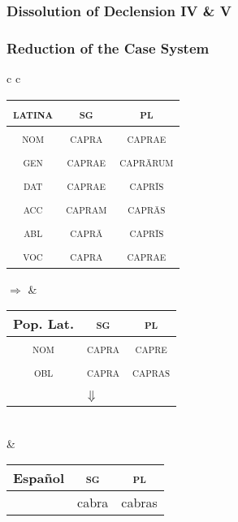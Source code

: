 \documentclass{report}
\begin{document}
\subsubsection{Dissolution of Declension IV \& V}

\subsubsection{Reduction of the Case System}

\begin{tabular}{c c}
  \begin{tabular}{|c|c|c|}
    \hline
    \textsc{latina} & \textsc{sg} & \textsc{pl} \\
    \hline
    \textsc{nom} & \cellcolor{gray} \textsc{capra} & \cellcolor{yellow} \textsc{caprae} \\
    \hline
    \textsc{gen} & \textsc{caprae} & \textsc{capr\={a}rum} \\
    \hline
    \textsc{dat} & \textsc{caprae} & \textsc{capr\={i}s} \\
    \hline
    \textsc{acc} & \cellcolor{cyan} \textsc{capram} & \cellcolor{red} \textsc{capr\={a}s} \\
    \hline
    \textsc{abl} & \textsc{capr\={a}} & \textsc{capr\={i}s} \\
    \hline
    \textsc{voc} & \textsc{capra} & \textsc{caprae} \\
    \hline
  \end{tabular} \quad $\Rightarrow$ &
                                      \begin{tabular}{|c|c|c|}
                                        \hline
                                        Pop. Lat. & \textsc{sg} & \textsc{pl} \\
                                        \hline
                                        \textsc{nom} & \cellcolor{gray} \textsc{capra} & \cellcolor{yellow} \textsc{capre} \\
                                        \hline
                                        \textsc{obl} & \cellcolor{cyan} \textsc{capra} & \cellcolor{red} \textsc{capras} \\
                                        \hline
                                        \multicolumn{3}{c}{} \\
                                        \multicolumn{3}{c}{$\Downarrow$}
                                      \end{tabular} \\
  &
  \begin{tabular}{|c|c|c|}
    \hline
    Español & \textsc{sg} & \textsc{pl} \\
    \hline
    & \cellcolor{cyan} cabra & \cellcolor{red} cabras \\
    \hline
  \end{tabular} \\
\end{tabular}
\end{document}
